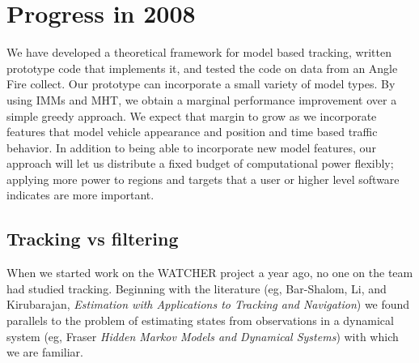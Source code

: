 \documentclass[]{article}
\begin{document}
\section*{Progress in 2008}
\label{sec:progres}

We have developed a theoretical framework for model based tracking,
written prototype code that implements it, and tested the code on data
from an Angle Fire collect.  Our prototype can incorporate a small
variety of model types.  By using IMMs and MHT, we obtain a marginal
performance improvement over a simple greedy approach.  We expect that
margin to grow as we incorporate features that model vehicle
appearance and position and time based traffic behavior.  In addition
to being able to incorporate new model features, our approach will let
us distribute a fixed budget of computational power flexibly; applying
more power to regions and targets that a user or higher level software
indicates are more important.

\subsection*{Tracking vs filtering}
\label{sec:track-filter}

When we started work on the WATCHER project a year ago, no one on the
team had studied tracking.  Beginning with the literature (eg,
Bar-Shalom, Li, and Kirubarajan, \emph{Estimation with Applications to
  Tracking and Navigation}) we found parallels to the problem of
estimating states from observations in a dynamical system (eg, Fraser
\emph{Hidden Markov Models and Dynamical Systems}) with which we are
familiar.
\end{document}
